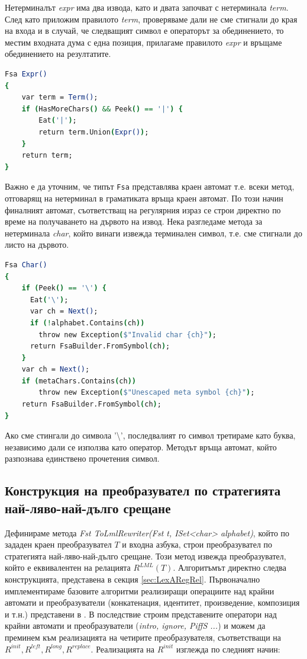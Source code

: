 \documentclass[12pt, oneside]{article}
\theoremstyle{definition}
\begin{document}
Нетерминалът \emph{expr} има два извода, като и двата започват с нетерминала \emph{term}. След като приложим правилото \emph{term}, проверяваме дали не сме стигнали до края на входа и в случай, че следващият символ е операторът за обединението, то местим входната дума с една позиция, прилагаме правилото \emph{expr} и връщаме обединението на резултатите.

\begin{lstlisting}[language=csh]
Fsa Expr() 
{
    var term = Term();
    if (HasMoreChars() && Peek() == '|') {
        Eat('|');
        return term.Union(Expr());
    }
    return term;
}
\end{lstlisting}

Важно е да уточним, че типът \verb/Fsa/ представлява краен автомат т.е. всеки метод, отговарящ на нетерминал в граматиката връща краен автомат. По този начин финалният автомат, съответстващ на регулярния израз се строи директно по време на получаването на дървото на извод. Нека разгледаме метода за нетерминала \emph{char}, който винаги извежда терминален символ, т.е. сме стигнали до листо на дървото.

\begin{lstlisting}[language=csh]
Fsa Char() 
{
    if (Peek() == '\') {
      Eat('\');
      var ch = Next();
      if (!alphabet.Contains(ch))
        throw new Exception($"Invalid char {ch}");
      return FsaBuilder.FromSymbol(ch);
    }	
    var ch = Next();
    if (metaChars.Contains(ch))
        throw new Exception($"Unescaped meta symbol {ch}");
    return FsaBuilder.FromSymbol(ch);
}
\end{lstlisting}

Ако сме стингали до символа '\textbackslash', последвалият го символ третираме като буква, независимо дали се използва като оператор. Методът връща автомат, който разпознава единствено прочетения символ.

\subsection{Конструкция на преобразувател по стратегията най-ляво-най-дълго срещане}

Дефинираме метода \emph{Fst ToLmlRewriter(Fst t, ISet<char> alphabet)}, който по зададен краен преобразувател \(T\) и входна азбука, строи преобразувател по стратегията най-ляво-най-дълго срещане. Този метод извежда преобразувател, който е еквивалентен на релацията \( R^{LML}(T) \). Алгоритъмът директно следва конструкцията, представена в секция \ref{sec:LexARegRel}. Първоначално имплементираме базовите алгоритми реализиращи операциите над крайни автомати и преобразуватели (конкатенация, идентитет, произведение, композиция и т.н.) представени в \cite{Mihov:2018}. В последствие строим представените оператори над крайни автомати и преобразуватели (\emph{intro, ignore, PiffS ...}) и можем да преминем към реализацията на четирите преобразувателя, съответстващи на \( R^{init}, R^{left}, R^{long}, R^{replace} \). Реализацията на \( R^{init} \) изглежда по следният начин:
\end{document}
